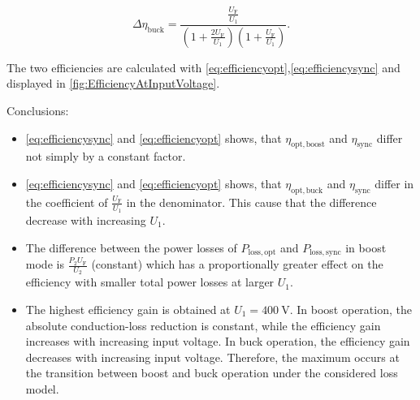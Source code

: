 \begin{solutionblock}
	\begin{equation}
		\Delta \eta_\mathrm{buck}= \frac{\frac{U_\mathrm{F}}{U_\mathrm{1}}}{\left(1+ \frac{2 U_\mathrm{F}}{U_\mathrm{1}}\right) \left(1+\frac{ U_\mathrm{F}}{U_\mathrm{1}}\right)}.
		\label{eq:efficiencygainbuck}
	\end{equation}

	The two efficiencies are calculated with \eqref{eq:efficiencyopt},\eqref{eq:efficiencysync}  and displayed in \autoref{fig:EfficiencyAtInputVoltage}.
	

	Conclusions:
	\begin{itemize}
		\item \eqref{eq:efficiencysync} and \eqref{eq:efficiencyopt} shows, that $\eta_\mathrm{opt,boost}$
		      and $\eta_\mathrm{sync}$ differ not simply by a constant factor.
		\item \eqref{eq:efficiencysync} and \eqref{eq:efficiencyopt} shows, that $\eta_\mathrm{opt,buck}$
		      and $\eta_\mathrm{sync}$ differ in the coefficient of $\frac{U_\mathrm{F}}{U_\mathrm{1}}$ in the denominator.
		      This cause that the difference decrease with increasing $U_\mathrm{1}$.
		\item The difference between the power losses of $P_\mathrm{loss,opt}$ and $P_\mathrm{loss,sync}$ in boost mode is
		      $\frac{P_\mathrm{2} U_\mathrm{F}}{U_\mathrm{2}}$ (constant)
		      which has a proportionally greater effect on the efficiency with smaller total power losses at larger $U_\mathrm{1}$.
		\item The highest efficiency gain is obtained at $U_\mathrm{1}=\SI{400}{\volt}$. In boost operation, the absolute conduction-loss reduction is constant, while the efficiency gain increases with increasing input voltage. In buck operation, the efficiency gain decreases with increasing input voltage. Therefore, the maximum occurs at the transition between boost and buck operation under the considered loss model.
	\end{itemize}

\end{solutionblock}
